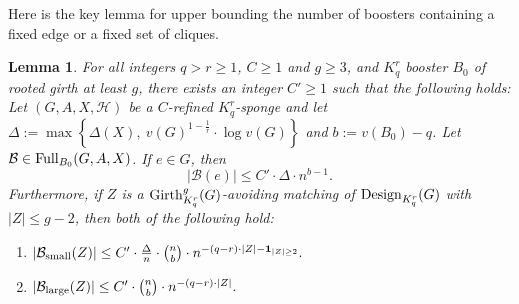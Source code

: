 \documentclass[11pt]{article}
\newcommand{\mc}[1]{\mathcal{#1}}
\newcounter{i}
\theoremstyle{plain}
\newtheorem{lem}[thm]{Lemma}
\theoremstyle{plain} %
\theoremstyle{definition}
\begin{document}
Here is the key lemma for upper bounding the number of boosters containing a fixed edge or a fixed set of cliques.

\begin{lem}\label{lem:BoostersContainingSetOfCliques}
For all integers $q>r\ge 1$, $C\ge 1$ and $g\ge 3$, and $K_q^r$ booster $B_0$ of rooted girth at least $g$, there exists an integer $C'\ge 1$ such that the following holds: Let $(G,A,X,\mc{H})$ be a $C$-refined $K_q^r$-sponge and let $\Delta := \max\left\{ \Delta(X),~v(G)^{1-\frac{1}{r}}\cdot \log v(G)\right\}$ and $b:=v(B_0)-q$. Let $\mc{B} \in {\rm Full}_{B_0}(G,A,X)$.
If $e\in G$, then
$$|\mc{B}(e)| \le C'\cdot \Delta\cdot n^{b-1}.$$
Furthermore, if $Z$ is a ${\rm Girth}_{K_q^r}^g(G)$-avoiding matching of ${\rm Design}_{K_q^r}(G)$ with $|Z|\le g-2$, then both of the following hold:
\begin{enumerate}
    \item[(1)] $|\mc{B}_{\rm small}(Z)| \le C'\cdot \frac{\Delta}{n}\cdot \binom{n}{b} \cdot n^{-(q-r)\cdot |Z| - {\bf 1}_{|Z|\ge 2}}.$
    \item[(2)] $|\mc{B}_{\rm large}(Z)|\le C'\cdot \binom{n}{b} \cdot n^{-(q-r)\cdot |Z|}.$    
\end{enumerate}
\end{lem}
\end{document}

